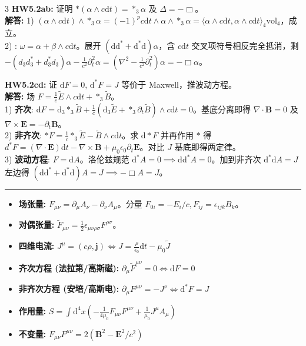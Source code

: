 \documentclass[9pt,a4paper]{article} %
\newcommand{\p}{\partial}
\newcommand{\diff}{\mathrm{d}}
\newcommand{\mbf}[1]{\mathbf{#1}}
\begin{document}
\begin{multicols*}{3}
\vspace{0.5ex}
\noindent\textbf{HW5.2ab:} 证明 $*(\alpha \wedge c\diff t) = *_3\alpha$ 及 $\Delta = -\Box$。\\
\textbf{解答:} 1) $(\alpha \wedge c\diff t) \wedge *_3\alpha = (-1)^p c\diff t \wedge \alpha \wedge *_3\alpha = \langle\alpha\wedge c\diff t,\alpha\wedge c\diff t\rangle_4\text{vol}_4$，成立。\\
2) : $\omega = \alpha + \beta \wedge c\diff t$。展开 $(\diff\diff^* + \diff^*\diff)\alpha$，含 $c\diff t$ 交叉项符号相反完全抵消，剩 $-(d_3 d_3^* + d_3^* d_3)\alpha - \frac{1}{c^2}\p_t^2\alpha = (\nabla^2 - \frac{1}{c^2}\p_t^2)\alpha = -\Box\alpha$。

\vspace{0.5ex}
\noindent\textbf{HW5.2cd:} 证 $\diff F=0$, $\diff^*F=J$ 等价于 Maxwell，推波动方程。\\
\textbf{解答:} 场 $F = \frac{1}{c}\tilde{E} \wedge c\diff t + *_3 \tilde{B}$。\\
1) \textbf{齐次}: $\diff F = \diff_3*_3\tilde{B} + \frac{1}{c}(\diff_3\tilde{E} + *_3\p_t\tilde{B})\wedge c\diff t = 0$。基底分离即得 $\nabla\cdot\mbf{B}=0$ 及 $\nabla\times\mbf{E}=-\p_t\mbf{B}$。\\
2) \textbf{非齐次}: $*F = \frac{1}{c}*_3\tilde{E} - \tilde{B}\wedge c\diff t$。求 $\diff*F$ 并再作用 $*$ 得 $d^*F = (\nabla\cdot\mbf{E})\diff t - \nabla\times\mbf{B} + \mu_0\epsilon_0\p_t\mbf{E}$。对比 $J$ 基底即得两定律。\\
3) \textbf{波动方程}: $F=\diff A$。洛伦兹规范 $\diff^*A=0 \implies \diff\diff^*A=0$。加到非齐次 $\diff^*\diff A = J$ 左边得 $(\diff\diff^* + \diff^*\diff)A = J \implies -\Box A = J$。


\vspace{1ex}\hrule\vspace{1ex}
\begin{itemize}
    \item \textbf{场张量:} $F_{\mu\nu} = \p_\mu A_\nu - \p_\nu A_\mu$。分量 $F_{0i} = -E_i/c, F_{ij} = \epsilon_{ijk}B_k$。
    \item \textbf{对偶张量:} $\tilde{F}_{\mu\nu} = \frac{1}{2}\epsilon_{\mu\nu\rho\sigma} F^{\rho\sigma}$。
    \item \textbf{四维电流:} $J^\mu = (c\rho, \mbf{j}) \iff J = \frac{\rho}{\epsilon_0}\diff t - \mu_0 \tilde{J}$
    \item \textbf{齐次方程 (法拉第/高斯磁):} $\p_\mu \tilde{F}^{\mu\nu} = 0 \iff \diff F = 0$
    \item \textbf{非齐次方程 (安培/高斯电):} $\p_\mu F^{\mu\nu} = -J^\nu \iff \diff^*F = J$
    \item \textbf{作用量:} $S = \int \diff^4x \left( -\frac{1}{4\mu_0} F_{\mu\nu}F^{\mu\nu} + \frac{1}{\mu_0} J^\mu A_\mu \right)$
    \item \textbf{不变量:} $F_{\mu\nu}F^{\mu\nu} = 2(\mbf{B}^2 - \mbf{E}^2/c^2)$
\end{itemize}


\end{multicols*}
\end{document}

